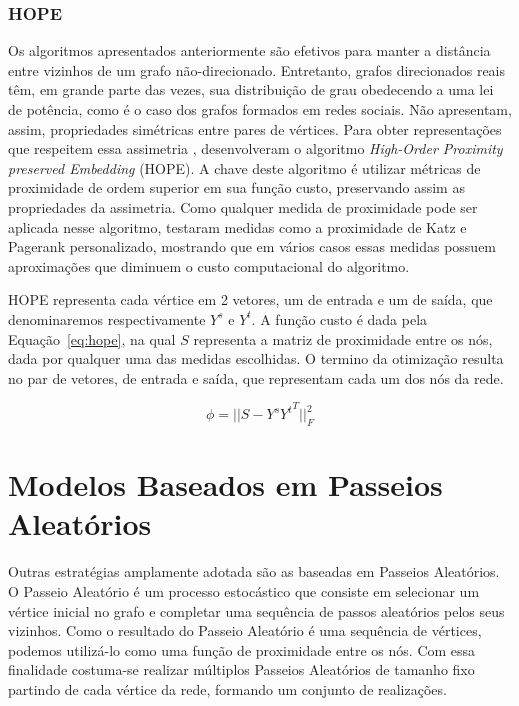 \subsubsection{HOPE}

Os algoritmos apresentados anteriormente são efetivos para manter a distância
entre vizinhos de um grafo não-direcionado.
Entretanto, grafos direcionados reais têm, em grande parte das vezes, sua
distribuição de grau obedecendo a uma lei de potência, como é o caso dos grafos
formados em redes sociais.
Não apresentam, assim, propriedades simétricas entre pares de vértices.
Para obter representações que respeitem essa assimetria \citet{ou16},
desenvolveram o algoritmo \textit{High-Order Proximity preserved Embedding}
(HOPE).
A chave deste algoritmo é utilizar métricas de proximidade de ordem superior em
sua função custo, preservando assim as propriedades da assimetria.
Como qualquer medida de proximidade pode ser aplicada nesse algoritmo, \citet{ou16}
testaram medidas como a proximidade de Katz e Pagerank personalizado, mostrando
que em vários casos essas medidas possuem aproximações que diminuem o custo
computacional do algoritmo.

HOPE representa cada vértice em 2 vetores, um de entrada e um de saída, que
denominaremos respectivamente $Y^s$ e $Y^t$.
A função custo é dada pela Equação~\ref{eq:hope}, na qual $S$ representa a matriz
de proximidade entre os nós, dada por qualquer uma das medidas escolhidas.
O termino da otimização resulta no par de vetores, de entrada e saída, que
representam cada um dos nós da rede.

\begin{equation} \label{eq:hope}
    \phi = \vert\vert S - Y^s {Y^t}^{T} \vert\vert^2_F
\end{equation}

\section{Modelos Baseados em Passeios Aleatórios}

Outras estratégias amplamente adotada são as baseadas em Passeios Aleatórios.
O Passeio Aleatório é um processo estocástico que consiste em selecionar um
vértice inicial no grafo e completar uma sequência de passos aleatórios pelos
seus vizinhos.
Como o resultado do Passeio Aleatório é uma sequência de vértices, podemos
utilizá-lo como uma função de proximidade entre os nós.
Com essa finalidade costuma-se realizar múltiplos Passeios Aleatórios de tamanho
fixo partindo de cada vértice da rede, formando um conjunto de realizações.

